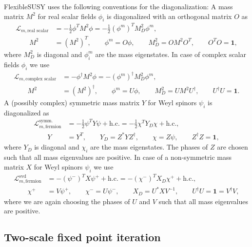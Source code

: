 \documentclass[final,3p,11pt,pdflatex]{elsarticle}
\makeatletter
\newcommand{\fs}{FlexibleSUSY\@\xspace}
\newcommand{\Lagr}{\mathcal{L}}
\newcommand{\unity}{\mathbf{1}}
\makeatother
\begin{document}
\fs uses the following conventions for the diagonalization: A mass
matrix $M^2$ for real scalar fields $\phi_i$ is diagonalized with an
orthogonal matrix $O$ as
%
\begin{align}
  \Lagr_{m,\text{real scalar}}
  &= - \frac{1}{2} \phi^T M^2 \phi
  = - \frac{1}{2} (\phi^m)^T M^2_D \phi^m, \\
  \qquad M^2 &= (M^2)^T ,
  \qquad \phi^m = O \phi ,
  \qquad M^2_D = O M^2 O^T ,
  \qquad O^T O = \unity ,
\end{align}
%
where $M^2_D$ is diagonal and $\phi^m_i$ are the mass eigenstates.  In
case of complex scalar fields $\phi_i$ we use
%
\begin{align}
  \Lagr_{m,\text{complex scalar}}
  &= - \phi^\dagger M^2 \phi
  = - (\phi^m)^\dagger M^2_D \phi^m, \\
  \qquad M^2 &= (M^2)^\dagger ,
  \qquad \phi^m = U \phi ,
  \qquad M^2_D = U M^2 U^\dagger ,
  \qquad U^\dagger U = \unity .
\end{align}
%
A (possibly complex) symmetric mass matrix $Y$ for Weyl spinors
$\psi_i$ is diagonalized as
%
\begin{align}
  \Lagr_{m,\text{fermion}}^\text{symm.}
  &= - \frac{1}{2} \psi^T Y \psi + \text{h.c.}
  = - \frac{1}{2} \chi^T Y_D \chi + \text{h.c.}, \\
  \qquad Y &= Y^T ,
  \qquad Y_D = Z^* Y Z^\dagger ,
  \qquad \chi = Z \psi ,
  \qquad Z^\dagger Z = \unity ,
\end{align}
%
where $Y_D$ is diagonal and $\chi_i$ are the mass eigenstates.  The
phases of $Z$ are chosen such that all mass eigenvalues are positive.
In case of a non-symmetric mass matrix $X$ for Weyl spinors $\psi_i$
we use
%
\begin{align}
  \Lagr_{m,\text{fermion}}^\text{svd}
  &= - (\psi^-)^T X \psi^+ + \text{h.c.}
  = - (\chi^-)^T X_D \chi^+ + \text{h.c.}, \\
  \qquad \chi^+ &= V \psi^+ ,
  \qquad \chi^- = U \psi^- ,
  \qquad X_D = U^* X V^{-1} ,
  \qquad U^\dagger U = \unity = V^\dagger V ,
\end{align}
%
where we are again choosing the phases of $U$ and $V$ such that all mass
eigenvalues are positive.

\subsection{Two-scale fixed point iteration}
\label{sec:TwoScaleFixedPointIteration}
\end{document}
